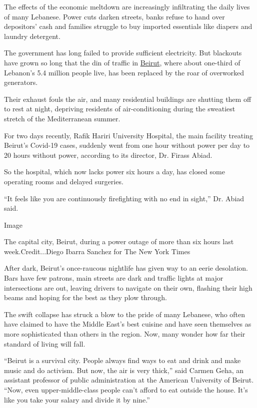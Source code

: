 The effects of the economic meltdown are increasingly infiltrating the
daily lives of many Lebanese. Power cuts darken streets, banks refuse to
hand over depositors' cash and families struggle to buy imported
essentials like diapers and laundry detergent.

The government has long failed to provide sufficient electricity. But
blackouts have grown so long that the din of traffic in
\href{https://www.nytimes.com/2020/08/04/world/middleeast/beirut-explosion-blast.html}{Beirut},
where about one-third of Lebanon's 5.4 million people live, has been
replaced by the roar of overworked generators.

Their exhaust fouls the air, and many residential buildings are shutting
them off to rest at night, depriving residents of air-conditioning
during the sweatiest stretch of the Mediterranean summer.

For two days recently, Rafik Hariri University Hospital, the main
facility treating Beirut's Covid-19 cases, suddenly went from one hour
without power per day to 20 hours without power, according to its
director, Dr. Firass Abiad.

So the hospital, which now lacks power six hours a day, has closed some
operating rooms and delayed surgeries.

``It feels like you are continuously firefighting with no end in
sight,'' Dr. Abiad said.

Image

The capital city, Beirut, during a power outage of more than six hours
last~ week.Credit...Diego Ibarra Sanchez for The New York Times

After dark, Beirut's once-raucous nightlife has given way to an eerie
desolation. Bars have few patrons, main streets are dark and traffic
lights at major intersections are out, leaving drivers to navigate on
their own, flashing their high beams and hoping for the best as they
plow through.

The swift collapse has struck a blow to the pride of many Lebanese, who
often have claimed to have the Middle East's best cuisine and have seen
themselves as more sophisticated than others in the region. Now, many
wonder how far their standard of living will fall.

``Beirut is a survival city. People always find ways to eat and drink
and make music and do activism. But now, the air is very thick,'' said
Carmen Geha, an assistant professor of public administration at the
American University of Beirut. ``Now, even upper-middle-class people
can't afford to eat outside the house. It's like you take your salary
and divide it by nine.''


